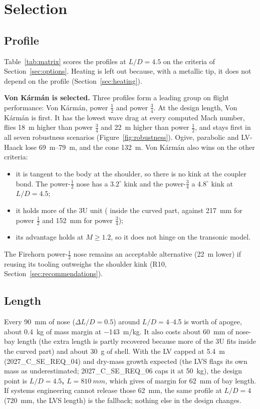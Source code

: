 \section{Selection}
\label{sec:selection}

\subsection{Profile}

Table~\ref{tab:matrix} scores the profiles at $L/D = 4.5$ on the criteria of
Section~\ref{sec:options}. Heating is left out because, with a metallic tip, it does not depend
on the profile (Section~\ref{sec:heating}).



\textbf{Von K\'arm\'an is selected.} Three profiles form a leading group on flight performance:
Von K\'arm\'an, power $\tfrac12$ and power $\tfrac34$. At the design length, Von K\'arm\'an is
first. It has the lowest wave drag at every computed Mach number, flies \SI{18}{m} higher than
power $\tfrac34$ and \SI{22}{m} higher than power $\tfrac12$, and stays first in all seven robustness
scenarios (Figure~\ref{fig:robustness}). Ogive, parabolic and LV-Haack lose \SIrange{69}{79}{m},
and the cone \SI{132}{m}. Von K\'arm\'an also wins on the other criteria:
\begin{itemize}[leftmargin=*,itemsep=2pt]
\item it is tangent to the body at the shoulder, so there is no kink at the coupler bond. The
power-$\tfrac12$ nose has a $3.2^\circ$ kink and the power-$\tfrac34$ a $4.8^\circ$ kink at
$L/D=4.5$;
\item it holds more of the 3U unit (\FINTHREEU{} inside the curved part, against
\SI{217}{mm} for power $\tfrac12$ and \SI{152}{mm} for power $\tfrac34$);
\item its advantage holds at $M \geq 1.2$, so it does not hinge on the transonic model.
\end{itemize}
The Firehorn power-$\tfrac12$ nose remains an acceptable alternative (\SI{22}{m} lower) if
reusing its tooling outweighs the shoulder kink (R10, Section~\ref{sec:recommendations}).

\subsection{Length}

Every \SI{90}{mm} of nose ($\Delta L/D = 0.5$) around $L/D = 4$--4.5 is worth \TRADELEN{} of
apogee, about \SI{0.4}{kg} of mass margin at \SI{-143}{m/kg}. It also costs about \SI{60}{mm} of
nose-bay length (the extra length is partly recovered because more of the 3U fits inside the
curved part) and about \SI{30}{g} of shell. With the LV capped at \SI{5.4}{m}
(2027\_C\_SE\_REQ\_04) and dry-mass growth expected (the LVS flags its own mass as
underestimated; 2027\_C\_SE\_REQ\_06 caps it at \SI{50}{kg}), the design point is
\textbf{$L/D = 4.5$, $L = \SI{810}{mm}$}, which gives \TRADELEN{} of margin for \SI{62}{mm} of
bay length. If systems engineering cannot release those \SI{62}{mm}, the same profile at
$L/D = 4$ (\SI{720}{mm}, the LVS length) is the fallback; nothing else in the design changes.

